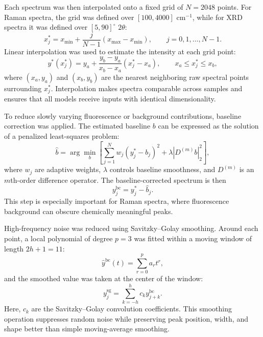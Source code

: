 Each spectrum was then interpolated onto a fixed grid of $N=2048$ points. For Raman spectra, the grid was defined over $[100,4000]$ cm$^{-1}$, while for XRD spectra it was defined over $[5,90]^\circ$ $2\theta$:
\begin{equation}
x_j^{*}=x_{\min}+\frac{j}{N-1}(x_{\max}-x_{\min}), \qquad j=0,1,\ldots,N-1.
\end{equation}
Linear interpolation was used to estimate the intensity at each grid point:
\begin{equation}
y^{*}(x_j^{*}) =
y_a+\frac{y_b-y_a}{x_b-x_a}(x_j^{*}-x_a),
\qquad x_a \leq x_j^{*} \leq x_b,
\end{equation}
where $(x_a,y_a)$ and $(x_b,y_b)$ are the nearest neighboring raw spectral points surrounding $x_j^{*}$. Interpolation makes spectra comparable across samples and ensures that all models receive inputs with identical dimensionality.

To reduce slowly varying fluorescence or background contributions, baseline correction was applied. The estimated baseline $b$ can be expressed as the solution of a penalized least-squares problem:
\begin{equation}
\hat{b}=\arg\min_{b}\left[
\sum_{j=1}^{N}w_j(y_j^{*}-b_j)^2
+\lambda|D^{(m)}b|_2^2
\right],
\end{equation}
where $w_j$ are adaptive weights, $\lambda$ controls baseline smoothness, and $D^{(m)}$ is an $m$th-order difference operator. The baseline-corrected spectrum is then
\begin{equation}
y_j^{\mathrm{bc}} = y_j^{*}-\hat{b}_j.
\end{equation}
This step is especially important for Raman spectra, where fluorescence background can obscure chemically meaningful peaks.

High-frequency noise was reduced using Savitzky--Golay smoothing. Around each point, a local polynomial of degree $p=3$ was fitted within a moving window of length $2h+1=11$:
\begin{equation}
\hat{y}^{\mathrm{bc}}(t)=\sum_{r=0}^{p}a_r t^r,
\end{equation}
and the smoothed value was taken at the center of the window:
\begin{equation}
y_j^{\mathrm{sg}}=\sum_{k=-h}^{h}c_k y_{j+k}^{\mathrm{bc}}.
\end{equation}
Here, $c_k$ are the Savitzky--Golay convolution coefficients. This smoothing operation suppresses random noise while preserving peak position, width, and shape better than simple moving-average smoothing.

